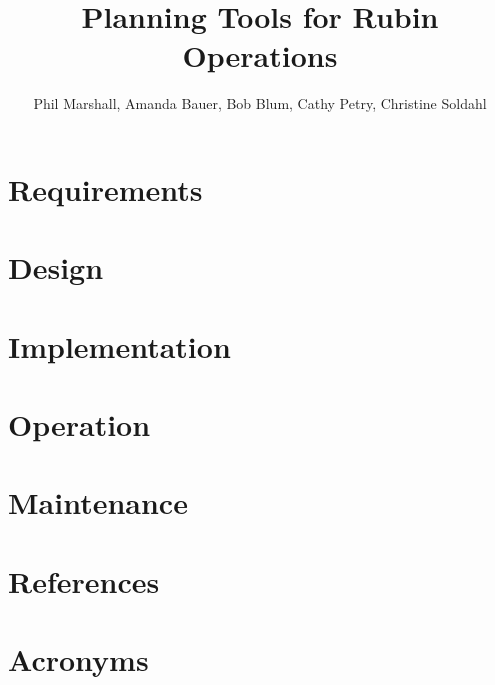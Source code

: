 \documentclass[DM,authoryear,toc]{lsstdoc}
\title{Planning Tools for Rubin Operations}
\author{%
Phil Marshall, 
Amanda Bauer,
Bob Blum,
Cathy Petry,
Christine Soldahl
}
\date{\vcsDate}
\begin{document}
\maketitle


\section{Requirements}
\label{sec:reqs}

\section{Design}
\label{sec:dsgn}

\section{Implementation}
\label{sec:impl}

\section{Operation}
\label{sec:oper}

\section{Maintenance}
\label{sec:mntn}



\appendix
\section{References} \label{sec:bib}
\renewcommand{\refname}{} %


\section{Acronyms} \label{sec:acronyms}

\end{document}
